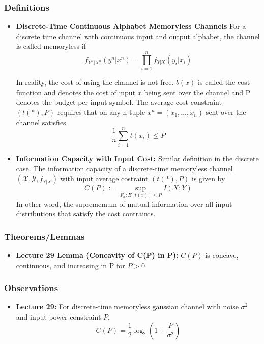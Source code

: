\documentclass{article}
\begin{document}
\subsubsection{Definitions}
\begin{itemize}
    \item \textbf{Discrete-Time Continuous Alphabet Memoryless Channels}
    For a discrete time channel with continuous input and output alphabet, the channel is called memoryless if
    \[f_{Y^n|X^n} (y^n|x^n) = \prod_{i=1}^n f_{Y|X}(y_i|x_i)\]

    In reality, the cost of using the channel is not free. \(b(x)\) is called the cost function and denotes the cost of input \(x\) being sent over the channel and P denotes the budget per input symbol.
    The average cost constraint \((t(*), P)\) requires that on any n-tuple \(x^n = (x_1, \ldots, x_n)\) sent over the channel satisfies
    \[\frac{1}{n} \sum_{i=1}^n t(x_i) \leq P\]

    \item \textbf{Information Capacity with Input Cost:}
    Similar definition in the discrete case. The information capacity of a discrete-time memoryless channel \((\mathcal{X}, \mathcal{Y}, f_{Y|X})\) with input average costraint \((t(*), P)\) is given by
    \[C(P) := \sup_{F_x: E[t(x)]\leq P} I(X;Y)\]
    In other word, the suprememum of mutual information over all input distributions that satisfy the cost contraints.

\end{itemize}
\subsubsection{Theorems/Lemmas}
\begin{itemize}
    \item \textbf{Lecture 29 Lemma (Concavity of C(P) in P):}
    \(C(P)\) is concave, continuous, and increasing in P for \(P>0\)
\end{itemize}
\subsubsection{Observations}
\begin{itemize}
    \item \textbf{Lecture 29:}
    For discrete-time memoryless gaussian channel with noise \(\sigma^2\) and input power constraint \(P\),
    \[C(P) = \frac{1}{2} \log_2(1+\frac{P}{\sigma^2})\]
\end{itemize}
\end{document}
